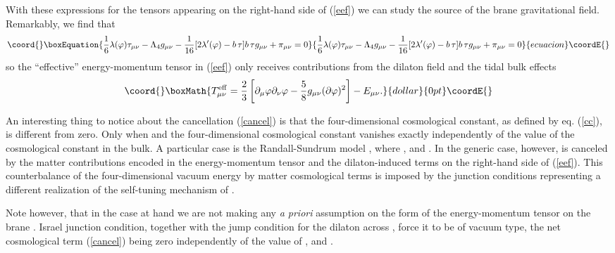 \documentclass[prd,a4paper,twocolumn,superscriptaddress,nofootinbib,showpacs]{revtex4}
\begin{document}
With these expressions for the tensors appearing on the right-hand side of (\ref{eef}) we can study the 
source of the brane gravitational field. Remarkably, we find that
\begin{equation}\coord{}\boxEquation{
{1\over 6}\lambda(\varphi)\tau_{\mu\nu}-\Lambda_{4}g_{\mu\nu}-{1\over 16}[2\lambda'(\varphi)-b\,\tau]b\,\tau
g_{\mu\nu}+\pi_{\mu\nu}=0
\label{cancel}
}{
{1\over 6}\lambda(\varphi)\tau_{\mu\nu}-\Lambda_{4}g_{\mu\nu}-{1\over 16}[2\lambda'(\varphi)-b\,\tau]b\,\tau
g_{\mu\nu}+\pi_{\mu\nu}=0
}{ecuacion}\coordE{}\end{equation}
so the ``effective'' energy-momentum tensor in (\ref{eef}) only receives contributions from the dilaton field
and the tidal bulk effects
$$\coord{}\boxMath{
T_{\mu\nu}^{\rm eff}= {2\over 3}\left[\partial_{\mu}\varphi\partial_{\nu}\varphi-{5\over 8} g_{\mu\nu}
(\partial\varphi)^2\right]-E_{\mu\nu}.
}{dollar}{0pt}\coordE{}$$

An interesting thing to notice about the cancellation (\ref{cancel}) is that the 
four-dimensional cosmological constant, as defined by eq. (\ref{cc}), is different from zero. 
Only when \coordHE{} and \coordHE{} the four-dimensional cosmological constant \coordHE{}
vanishes exactly independently of the value of the cosmological constant in the bulk.
A particular case is the Randall-Sundrum model \cite{rs}, where
\coordHE{}, \coordHE{} and \coordHE{}.
In the generic case, however, \coordHE{} is canceled by the matter contributions encoded 
in the energy-momentum tensor and the dilaton-induced terms on the right-hand side of (\ref{eef}). 
This counterbalance of the four-dimensional vacuum energy by matter cosmological
terms is imposed by the junction conditions representing a different realization of
the self-tuning mechanism of \cite{kach,kachh}. 

Note however, that in the case at hand we are not making any {\it a priori} assumption on the
form of the energy-momentum tensor on the brane \myHighlight{$\tau_{\mu\nu}$}\coordHE{}. Israel junction
condition, together with the jump condition for the dilaton across \coordHE{},
force it to be of vacuum type, the net cosmological term (\ref{cancel}) being zero 
independently of the value of \coordHE{}, \coordHE{} and \myHighlight{$\xi$}\coordHE{}. 
\end{document}
